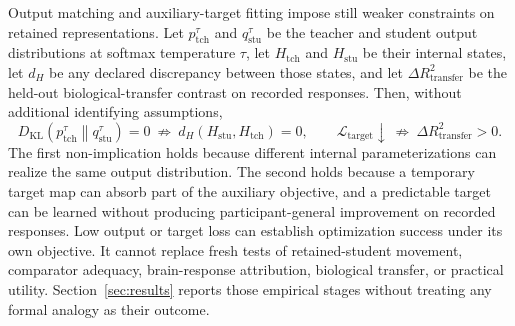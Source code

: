 Output matching and auxiliary-target fitting impose still weaker constraints on retained representations.
Let \(p^\tau_{\mathrm{tch}}\) and \(q^\tau_{\mathrm{stu}}\) be the teacher and student output distributions at softmax temperature \(\tau\), let \(H_{\mathrm{tch}}\) and \(H_{\mathrm{stu}}\) be their internal states, let \(d_H\) be any declared discrepancy between those states, and let \(\Delta R_{\mathrm{transfer}}^2\) be the held-out biological-transfer contrast on recorded responses.
Then, without additional identifying assumptions,
\[
  D_{\mathrm{KL}}\!\left(p^\tau_{\mathrm{tch}}\middle\|q^\tau_{\mathrm{stu}}\right)=0
  \ \not\Rightarrow\
  d_H(H_{\mathrm{stu}},H_{\mathrm{tch}})=0,
  \qquad
  \mathcal L_{\mathrm{target}}\downarrow
  \ \not\Rightarrow\
  \Delta R_{\mathrm{transfer}}^2>0.
\]
The first non-implication holds because different internal parameterizations can realize the same output distribution.
The second holds because a temporary target map can absorb part of the auxiliary objective, and a predictable target can be learned without producing participant-general improvement on recorded responses.
Low output or target loss can establish optimization success under its own objective.
It cannot replace fresh tests of retained-student movement, comparator adequacy, brain-response attribution, biological transfer, or practical utility.
Section~\ref{sec:results} reports those empirical stages without treating any formal analogy as their outcome. 
